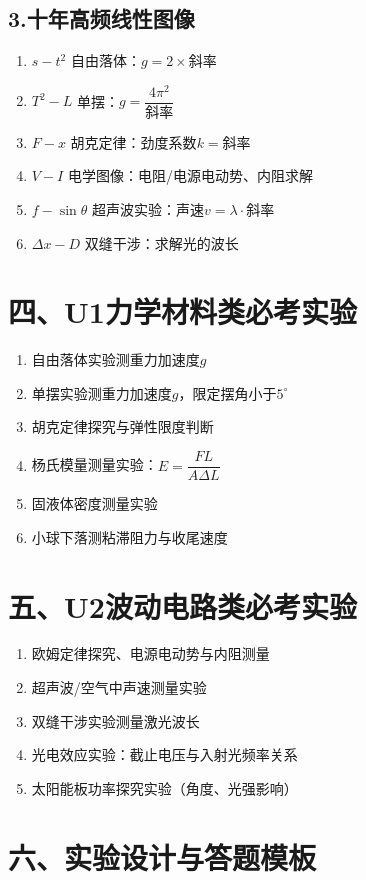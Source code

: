 \documentclass[a4paper,11pt]{article}
\begin{document}
\subsection{3.十年高频线性图像}
\begin{enumerate}
    \item $s-t^2$ 自由落体：$g=2\times$斜率
    \item $T^2-L$ 单摆：$g=\dfrac{4\pi^2}{\text{斜率}}$
    \item $F-x$ 胡克定律：劲度系数$k=$斜率
    \item $V-I$ 电学图像：电阻/电源电动势、内阻求解
    \item $f-\sin\theta$ 超声波实验：声速$v=\lambda\cdot \text{斜率}$
    \item $\Delta x-D$ 双缝干涉：求解光的波长
\end{enumerate}

\section{四、U1力学材料类必考实验}
\begin{enumerate}
    \item 自由落体实验测重力加速度$g$
    \item 单摆实验测重力加速度$g$，限定摆角小于$5^\circ$
    \item 胡克定律探究与弹性限度判断
    \item 杨氏模量测量实验：$E=\dfrac{FL}{A\Delta L}$
    \item 固液体密度测量实验
    \item 小球下落测粘滞阻力与收尾速度
\end{enumerate}

\section{五、U2波动电路类必考实验}
\begin{enumerate}
    \item 欧姆定律探究、电源电动势与内阻测量
    \item 超声波/空气中声速测量实验
    \item 双缝干涉实验测量激光波长
    \item 光电效应实验：截止电压与入射光频率关系
    \item 太阳能板功率探究实验（角度、光强影响）
\end{enumerate}

\section{六、实验设计与答题模板}
\end{document}
